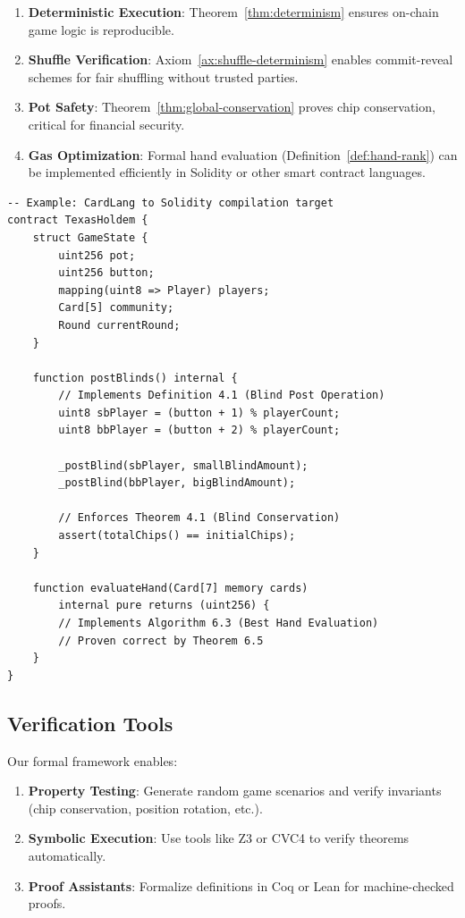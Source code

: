 \documentclass[11pt,a4paper]{article}
\begin{document}
\begin{enumerate}
    \item \textbf{Deterministic Execution}: Theorem~\ref{thm:determinism} ensures on-chain game logic is reproducible.
    \item \textbf{Shuffle Verification}: Axiom~\ref{ax:shuffle-determinism} enables commit-reveal schemes for fair shuffling without trusted parties.
    \item \textbf{Pot Safety}: Theorem~\ref{thm:global-conservation} proves chip conservation, critical for financial security.
    \item \textbf{Gas Optimization}: Formal hand evaluation (Definition~\ref{def:hand-rank}) can be implemented efficiently in Solidity or other smart contract languages.
\end{enumerate}

\begin{lstlisting}[style=haskell]
-- Example: CardLang to Solidity compilation target
contract TexasHoldem {
    struct GameState {
        uint256 pot;
        uint256 button;
        mapping(uint8 => Player) players;
        Card[5] community;
        Round currentRound;
    }

    function postBlinds() internal {
        // Implements Definition 4.1 (Blind Post Operation)
        uint8 sbPlayer = (button + 1) % playerCount;
        uint8 bbPlayer = (button + 2) % playerCount;

        _postBlind(sbPlayer, smallBlindAmount);
        _postBlind(bbPlayer, bigBlindAmount);

        // Enforces Theorem 4.1 (Blind Conservation)
        assert(totalChips() == initialChips);
    }

    function evaluateHand(Card[7] memory cards)
        internal pure returns (uint256) {
        // Implements Algorithm 6.3 (Best Hand Evaluation)
        // Proven correct by Theorem 6.5
    }
}
\end{lstlisting}

\subsection{Verification Tools}

Our formal framework enables:

\begin{enumerate}
    \item \textbf{Property Testing}: Generate random game scenarios and verify invariants (chip conservation, position rotation, etc.).
    \item \textbf{Symbolic Execution}: Use tools like Z3 or CVC4 to verify theorems automatically.
    \item \textbf{Proof Assistants}: Formalize definitions in Coq or Lean for machine-checked proofs.
\end{enumerate}
\end{document}
